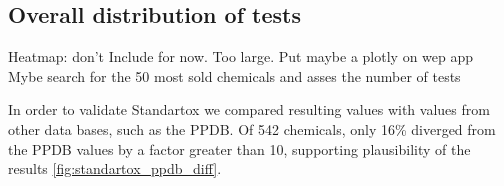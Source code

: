 \subsection{Overall distribution of tests}
Heatmap: don't Include for now. Too large.
Put maybe a plotly on wep app
Mybe search for the 50 most sold chemicals and asses the number of tests


In order to validate Standartox we compared resulting values with values from other data bases, such as the PPDB. Of 542 chemicals, only 16\% diverged from the PPDB values by a factor greater than 10, supporting plausibility of the \standartox results \ref{fig:standartox_ppdb_diff}.


